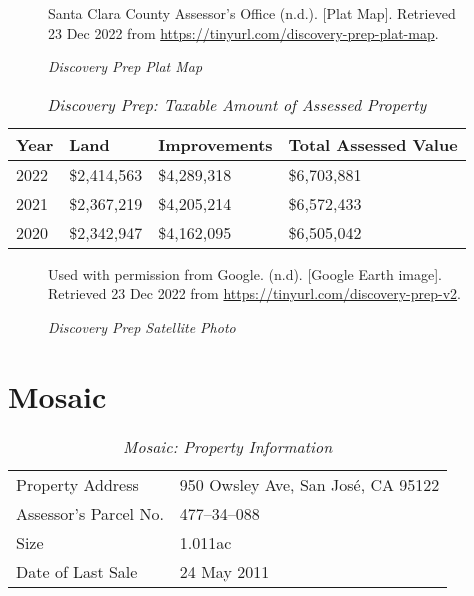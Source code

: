 \begin{figure}[hbtp]
  \caption[Discovery Prep Plat Map]{\textit{Discovery Prep Plat Map}}%
  \label{fig:discovery-prep-plat-map}
  {Santa Clara County Assessor's Office (n.d.). [Plat Map]. Retrieved 23 Dec 2022 from  \url{https://tinyurl.com/discovery-prep-plat-map}.}
\end{figure}

\begin{table}[hbtp]
  \SingleSpacing%
  \caption[Discovery Prep: Taxable Amount of Assessed Propery]{\textit{Discovery Prep: Taxable Amount of Assessed Property}}\label{tab:discovery-prep-taxable-amount}
  \begin{tabular}{llll}
    \toprule
    Year & Land        & Improvements & Total Assessed Value \\
    \midrule
    2022 & \$2,414,563 & \$4,289,318  & \$6,703,881 \\
    2021 & \$2,367,219 & \$4,205,214  & \$6,572,433 \\
    2020 & \$2,342,947 & \$4,162,095  & \$6,505,042 \\
    \bottomrule
  \end{tabular}
\end{table}

\begin{figure}[hbtp]
  \caption[Discovery Prep Satellite Photo]{\textit{Discovery Prep Satellite Photo}}%
  \label{fig:discovery-prep-sat-photo}
  {Used with permission from Google. (n.d). [Google Earth image]. Retrieved 23 Dec 2022 from \url{https://tinyurl.com/discovery-prep-v2}.}
\end{figure}


\clearpage
\section{Mosaic}\label{sec:mosaic-info}\indent

\begin{table}[htbp]
  \SingleSpacing%
  \caption[Mosaic: Property Information]{\textit{Mosaic: Property Information}}\label{tab:mosaic-prop-info}
  \begin{tabular}{ll}
    \toprule
    Property Address      & 950 Owsley Ave, San José, CA 95122 \\
    Assessor's Parcel No. & 477–34–088 \\
    Size                  & 1.011ac \\
    Date of Last Sale     & 24 May 2011 \\
    \bottomrule
  \end{tabular}
\end{table}

